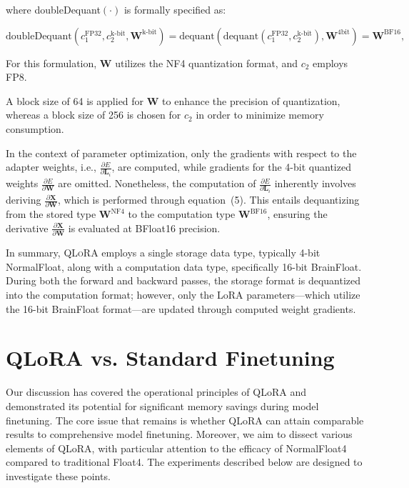 where doubleDequant$(\cdot)$ is formally specified as:

\begin{equation}
    \text{doubleDequant}(c_1^{\text{FP32}}, c_2^{\text{k-bit}}, \mathbf{W}^{\text{k-bit}}) = \text{dequant}(\text{dequant}(c_1^{\text{FP32}}, c_2^{\text{k-bit}}), \mathbf{W}^{\text{4bit}}) = \mathbf{W}^{\text{BF16}},
\end{equation}

For this formulation, $\mathbf{W}$ utilizes the NF4 quantization format, and $c_2$ employs FP8.

A block size of 64 is applied for $\mathbf{W}$ to enhance the precision of quantization, whereas a block size of 256 is chosen for $c_2$ in order to minimize memory consumption.

In the context of parameter optimization, only the gradients with respect to the adapter weights, i.e., $\frac{\partial E}{\partial \mathbf{L}_i}$, are computed, while gradients for the 4-bit quantized weights $\frac{\partial E}{\partial \mathbf{W}}$ are omitted. Nonetheless, the computation of $\frac{\partial E}{\partial \mathbf{L}_i}$ inherently involves deriving $\frac{\partial \mathbf{X}}{\partial \mathbf{W}}$, which is performed through equation~(5). This entails dequantizing from the stored type $\mathbf{W}^{\text{NF4}}$ to the computation type $\mathbf{W}^{\text{BF16}}$, ensuring the derivative $\frac{\partial \mathbf{X}}{\partial \mathbf{W}}$ is evaluated at BFloat16 precision.

In summary, \textsc{QLoRA} employs a single storage data type, typically 4-bit NormalFloat, along with a computation data type, specifically 16-bit BrainFloat. During both the forward and backward passes, the storage format is dequantized into the computation format; however, only the LoRA parameters—which utilize the 16-bit BrainFloat format—are updated through computed weight gradients.

\section{QLoRA vs. Standard Finetuning}
\label{sec:comp_to_std}

Our discussion has covered the operational principles of QLoRA and demonstrated its potential for significant memory savings during model finetuning. The core issue that remains is whether QLoRA can attain comparable results to comprehensive model finetuning. Moreover, we aim to dissect various elements of QLoRA, with particular attention to the efficacy of NormalFloat4 compared to traditional Float4. The experiments described below are designed to investigate these points.

